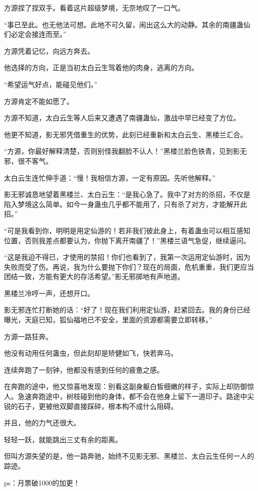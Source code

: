 \begin{this_body}
方源捏了捏双手。看着这片超级梦境，无奈地叹了一口气。

“事已至此。也无他法可想。此地不可久留，闹出这么大的动静。其余的南疆蛊仙们必定会接连而至。”

方源凭着记忆，向远方奔去。

他选择的方向，正是当初太白云生驾着他的肉身，逃离的方向。

“希望运气好点，能碰见他们。”

方源肯定不能如愿了。

方源不知道，太白云生等人后来又遭遇了南疆蛊仙，激战中早已经变了方位。

他更不知道，影无邪凭借重生的优势，此刻已经重新和太白云生、黑楼兰汇合。

“方源，你最好解释清楚，否则别怪我翻脸不认人！”黑楼兰脸色铁青，见到影无邪，很不客气。

太白云生连忙伸手道：“慢！我相信方源，一定有原因。先听他解释。”

影无邪诚恳地望着黑楼兰、太白云生：“是我心急了。我中了对方的杀招，不仅是陷入梦境这么简单。如今一身蛊虫几乎都不能用了，只有杀了对方，才能解开此招。”

“可是我看到你，明明是用定仙游的！若非我们彼此身上，有着蛊虫可以相互感知位置，否则我差点都要认为，你抛下离开南疆了！”黑楼兰语气急促，继续逼问。

“这是我迫不得已，才使用的禁招！你们也看到了，我第一次运用定仙游时，因为失败而受了伤。再说，我为什么要抛下你们？现在的局面，危机重重，我们更应当团结一致，方能有更大的存活希望。”影无邪掷地有声地道。

黑楼兰冷哼一声，还想开口。

影无邪连忙打断她的话：“好了！现在我们利用定仙游，赶紧回去。我的身份已经曝光，天庭已知，狐仙福地已不安全，里面的资源都需要立即转移。”

方源一路狂奔。

他没有动用任何蛊虫，但此刻却是矫健如飞，快若奔马。

连续奔跑了一刻钟，他都没有感到任何的疲惫之感。

在奔跑的途中，他又惊喜地发现：别看这副身躯白皙细嫩的样子，实际上却防御惊人。急速奔跑途中，树枝碰到他的身体，都不会在他身上留下一道印子。路途中尖锐的石子，更被他双脚直接踩碎，根本构不成什么阻碍。

并且，他的力气还很大。

轻轻一跃，就能跳出三丈有余的距离。

但叫方源失望的是，他一路奔驰，始终不见影无邪、黑楼兰、太白云生任何一人的踪迹。

ps：月票破1000的加更！

\end{this_body}


